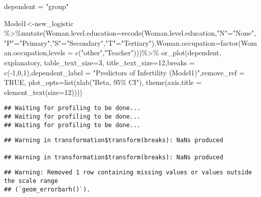 \documentclass[
]{article}
\newenvironment{Shaded}{\begin{snugshade}}{\end{snugshade}}
\newcommand{\AttributeTok}[1]{\textcolor[rgb]{0.77,0.63,0.00}{#1}}
\newcommand{\ConstantTok}[1]{\textcolor[rgb]{0.00,0.00,0.00}{#1}}
\newcommand{\DecValTok}[1]{\textcolor[rgb]{0.00,0.00,0.81}{#1}}
\newcommand{\FunctionTok}[1]{\textcolor[rgb]{0.00,0.00,0.00}{#1}}
\newcommand{\NormalTok}[1]{#1}
\newcommand{\OtherTok}[1]{\textcolor[rgb]{0.56,0.35,0.01}{#1}}
\newcommand{\SpecialCharTok}[1]{\textcolor[rgb]{0.00,0.00,0.00}{#1}}
\newcommand{\StringTok}[1]{\textcolor[rgb]{0.31,0.60,0.02}{#1}}
\begin{document}
\begin{Shaded}
\begin{Highlighting}[]
\NormalTok{dependent }\OtherTok{=} \StringTok{"group"}

\NormalTok{Model1}\OtherTok{\textless{}{-}}\NormalTok{new\_logistic }\SpecialCharTok{\%\textgreater{}\%}\FunctionTok{mutate}\NormalTok{(}\AttributeTok{Woman.level.education=}\FunctionTok{recode}\NormalTok{(Woman.level.education,}\StringTok{"N"}\OtherTok{=}\StringTok{"None"}\NormalTok{,}\StringTok{"P"}\OtherTok{=}\StringTok{"Primary"}\NormalTok{,}\StringTok{"S"}\OtherTok{=}\StringTok{"Secondary"}\NormalTok{,}\StringTok{"T"}\OtherTok{=}\StringTok{"Tertiary"}\NormalTok{),}\AttributeTok{Woman.occupation=}\FunctionTok{factor}\NormalTok{(Woman.occupation,}\AttributeTok{levels =} \FunctionTok{c}\NormalTok{(}\StringTok{"other"}\NormalTok{,}\StringTok{"Teacher"}\NormalTok{)))}\SpecialCharTok{\%\textgreater{}\%}
    \FunctionTok{or\_plot}\NormalTok{(dependent, explanatory, }\AttributeTok{table\_text\_size=}\DecValTok{3}\NormalTok{, }
            \AttributeTok{title\_text\_size=}\DecValTok{12}\NormalTok{,}\AttributeTok{breaks =} \FunctionTok{c}\NormalTok{(}\SpecialCharTok{{-}}\DecValTok{1}\NormalTok{,}\DecValTok{0}\NormalTok{,}\DecValTok{1}\NormalTok{),}\AttributeTok{dependent\_label =} \StringTok{"Predictors of Infertility (Model1)"}\NormalTok{,}\AttributeTok{remove\_ref =} \ConstantTok{TRUE}\NormalTok{,}
            \AttributeTok{plot\_opts=}\FunctionTok{list}\NormalTok{(}\FunctionTok{xlab}\NormalTok{(}\StringTok{"Beta, 95\% CI"}\NormalTok{),}
                           \FunctionTok{theme}\NormalTok{(}\AttributeTok{axis.title =} \FunctionTok{element\_text}\NormalTok{(}\AttributeTok{size=}\DecValTok{12}\NormalTok{))))}
\end{Highlighting}
\end{Shaded}

\begin{verbatim}
## Waiting for profiling to be done...
## Waiting for profiling to be done...
## Waiting for profiling to be done...
\end{verbatim}

\begin{verbatim}
## Warning in transformation$transform(breaks): NaNs produced

## Warning in transformation$transform(breaks): NaNs produced
\end{verbatim}

\begin{verbatim}
## Warning: Removed 1 row containing missing values or values outside the scale range
## (`geom_errorbarh()`).
\end{verbatim}
\end{document}
